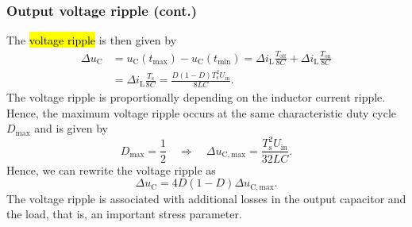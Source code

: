 \begin{frame}
    \frametitle{Output voltage ripple (cont.)}
    The \hl{voltage ripple} is then given by
    \begin{equation}
        \begin{split}
            \Delta u_\mathrm{C} &= u_\mathrm{C}(t_\mathrm{max}) - u_\mathrm{C}(t_\mathrm{min}) = \Delta i_\mathrm{L}\frac{T_\mathrm{off}}{8C} + \Delta i_\mathrm{L}\frac{T_\mathrm{on}}{8C}\\
                                &= \Delta i_\mathrm{L}\frac{T_\mathrm{s}}{8C} = \frac{D(1-D)T_\mathrm{s}^2U_\mathrm{in}}{8LC}.
        \end{split}
    \end{equation}
    The voltage ripple is proportionally depending on the inductor current ripple. Hence, the maximum voltage ripple occurs at the same characteristic duty cycle $D_\mathrm{max}$ and is given by
    \begin{equation}
        D_\mathrm{max}=\frac{1}{2} \quad \Rightarrow \quad \Delta u_\mathrm{C, max} =  \frac{T_\mathrm{s}^2U_\mathrm{in}}{32 LC}.
    \end{equation}
    Hence, we can rewrite the voltage ripple as
    \begin{equation}
        \Delta u_\mathrm{C} =   4D(1-D)\Delta u_\mathrm{C, max}.
    \end{equation}
    The voltage ripple is associated with additional losses in the output capacitor and the load, that is, an important stress parameter.
\end{frame}

